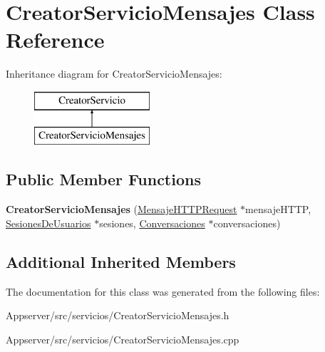 \hypertarget{classCreatorServicioMensajes}{}\section{Creator\+Servicio\+Mensajes Class Reference}
\label{classCreatorServicioMensajes}
Inheritance diagram for Creator\+Servicio\+Mensajes\+:\begin{figure}[H]
\begin{center}
\leavevmode
\includegraphics[height=2.000000cm]{classCreatorServicioMensajes}
\end{center}
\end{figure}
\subsection*{Public Member Functions}
\begin{DoxyCompactItemize}
\item 
{\bfseries Creator\+Servicio\+Mensajes} (\hyperlink{classMensajeHTTPRequest}{Mensaje\+H\+T\+T\+P\+Request} $\ast$mensaje\+H\+T\+TP, \hyperlink{classSesionesDeUsuarios}{Sesiones\+De\+Usuarios} $\ast$sesiones, \hyperlink{classConversaciones}{Conversaciones} $\ast$conversaciones)\hypertarget{classCreatorServicioMensajes_aa580f0c16e6ecf818f8a9a2a28ef2ed0}{}\label{classCreatorServicioMensajes_aa580f0c16e6ecf818f8a9a2a28ef2ed0}

\end{DoxyCompactItemize}
\subsection*{Additional Inherited Members}


The documentation for this class was generated from the following files\+:\begin{DoxyCompactItemize}
\item 
Appserver/src/servicios/Creator\+Servicio\+Mensajes.\+h\item 
Appserver/src/servicios/Creator\+Servicio\+Mensajes.\+cpp\end{DoxyCompactItemize}
